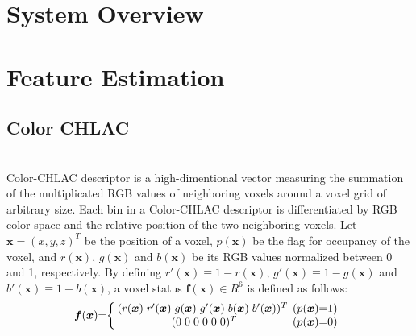 \documentclass[conference]{sty/IEEEtran}
\begin{document}
\section{System Overview}
\label{sec:overview}

\section{Feature Estimation}
\label{sec:features}

\subsection{Color CHLAC}
\\
Color-CHLAC descriptor is a high-dimentional vector measuring the summation of the multiplicated RGB values of neighboring voxels around a voxel grid of arbitrary size. 
Each bin in a Color-CHLAC descriptor is differentiated by RGB color space and the relative position of the two neighboring voxels. 
Let $\bm{x}=(x,y,z)^T$ be the position of a voxel, $p(\bm{x})$ be the flag for occupancy of the voxel, 
 and $r(\bm{x})$, $g(\bm{x})$ and $b(\bm{x})$ be its RGB values normalized between 0 and 1, respectively. 
By defining $r'(\bm{x}) \equiv 1 - r(\bm{x})$, $g'(\bm{x}) \equiv 1 - g(\bm{x})$ and $b'(\bm{x}) \equiv 1 - b(\bm{x})$, 
    a voxel status $\bm{f}(\bm{x})\in R^6$ is defined as follows: 
\begin{eqnarray*}
  \label{eq:voxel}
  \bm{f}({\bm x})\hspace{-1mm}=\hspace{-1mm}\left\{
  \begin{array}{cc}
    \hspace{-1mm}
    (r({\bm x})\hspace{1mm} r'({\bm x}) \hspace{1mm}g({\bm x}) \hspace{1mm}g'({\bm x}) \hspace{1mm}b({\bm x}) \hspace{1mm}b'({\bm x}))^T & \hspace{-2mm}(p({\bm x})\hspace{-1mm}=\hspace{-1mm}1) \\
    (0\hspace{1mm}0\hspace{1mm}0\hspace{1mm}0\hspace{1mm}0\hspace{1mm}0)^T & \hspace{-2mm}(p({\bm x})\hspace{-1mm}=\hspace{-1mm}0)
  \end{array}\right.
\end{eqnarray*}
\end{document}
